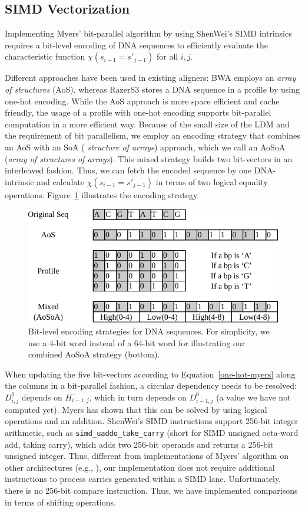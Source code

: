 \subsection{SIMD Vectorization}

Implementing Myers' bit-parallel algorithm by using ShenWei's SIMD
intrinsics requires a bit-level encoding of DNA sequences to
efficiently evaluate the characteristic function $\chi(s_{i-1} =
s'_{j-1})$ for all $i, j$.

Different approaches have been used in existing aligners: BWA
\cite{bwa} employs an {\em array of structures} (AoS), whereas RazerS3
\cite{razers3} stores a DNA sequence in a profile by using one-hot
encoding. While the AoS approach is more space efficient and
cache friendly, the usage of a profile with one-hot encoding supports
bit-parallel computation in a more efficient way.  Because of the
small size of the LDM and the requirement of bit parallelism, we
employ an encoding strategy that combines an AoS with an SoA ({\em
  structure of arrays}) approach, which we call an AoSoA ({\em array
  of structures of arrays}). This mixed strategy builds two
bit-vectors in an interleaved fashion. Thus, we can fetch the encoded
sequence by one DNA-intrinsic and calculate $\chi(s_{i-1} = s'_{j-1})$
in terms of two logical equality operations. Figure~\ref{MixPack}
illustrates the encoding strategy.

\begin{figure}[!htb]
  \includegraphics[width=0.9\linewidth]{figures/MixPack}
  \caption{Bit-level encoding strategies for DNA sequences. For
    simplicity, we use a 4-bit word instead of a 64-bit word for
    illustrating our combined AoSoA strategy (bottom).}
  \label{MixPack}
\end{figure}

When updating the five bit-vectors according to
Equation~\ref{one-hot-myers} along the columns in a bit-parallel
fashion, a circular dependency needs to be resolved: $D^0_{i,j}$
depends on $H^-_{i-1, j}$, which in turn depends on $D^0_{i-1,j}$ (a
value we have not computed yet). Myers \cite{myers} has shown that
this can be solved by using logical operations and an
addition. ShenWei's SIMD instructions support 256-bit integer
arithmetic, such as \texttt{simd\_uaddo\_take\_carry} (short for SIMD
unsigned octa-word add, taking carry), which adds two 256-bit operands
and returns a 256-bit unsigned integer. Thus, different from
implementations of Myers' algorithm on other architectures (e.g.,
\cite{chacon}), our implementation does not require additional
instructions to process carries generated within a SIMD
lane. Unfortunately, there is no 256-bit compare instruction. Thus, we
have implemented comparisons in terms of shifting operations.

